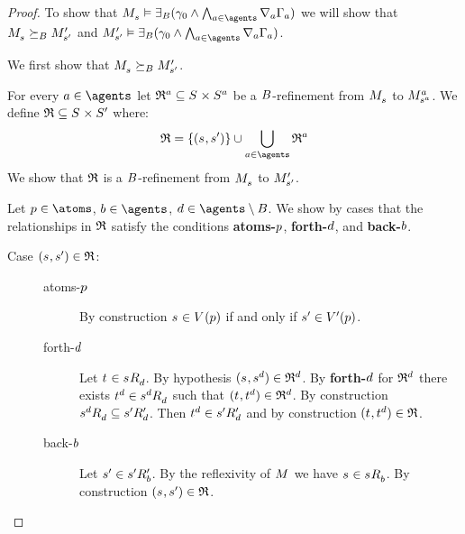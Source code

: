 \begin{proof}
To show that $\kPModel{\kStateS} \entails \somerefsBs (\gamma_0 \land \bigwedge_{\agentA \in \agents} \coversA \Gamma_\agentA)$ we will show that $\kPModel{\kStateS} \simulatesBs \kPModelP{\kStateSP}$ and $\kPModelP{\kStateSP} \entails \somerefsBs (\gamma_0 \land \bigwedge_{\agentA \in \agents} \coversA \Gamma_\agentA)$.

We first show that $\kPModel{\kStateS} \simulatesBs \kPModelP{\kStateSP}$.

For every $\agentA \in \agents$ let $\refinement^\agentA \subseteq \kStates \times \kStates[\agentA]$ be a $\agentsB$-refinement from $\kPModel{\kStateS}$ to $\kPModel[\agentA]{\kStateS[\agentA]}$.
We define $\refinement \subseteq \kStates \times \kStatesP$ where:
$$
\refinement = \{(\kStateS, \kStateSP)\} \cup \bigcup_{\agentA \in \agents} \refinement^\agentA
$$
We show that $\refinement$ is a $\agentsB$-refinement from $\kPModel{\kStateS}$ to $\kPModelP{\kStateSP}$.

Let $\atomP \in \atoms$, $\agentB \in \agents$, $\agentD \in \agents \setminus \agentsB$.
We show by cases that the relationships in $\refinement$ satisfy the conditions {\bf atoms-$\atomP$}, {\bf forth-$\agentD$}, and {\bf back-$\agentB$}.

\begin{description}
    \item[Case $(\kStateS, \kStateSP) \in \refinement$:]
        \hfill
        \begin{description}
            \item[atoms-$\atomP$]
                By construction $\kStateS \in \kValuation(\atomP)$ if and only if $\kStateSP \in \kValuationP(\atomP)$.
            \item[forth-$\agentD$]
                Let $\kStateT \in \kSuccessorsD{\kStateS}$.
                By hypothesis $(\kStateS, \kStateS[\agentD]) \in \refinement^\agentD$.
                By {\bf forth-$\agentD$} for $\refinement^\agentD$ there exists $\kStateT[\agentD] \in \kSuccessorsD{\kStateS[\agentD]}$ such that $(\kStateT, \kStateT[\agentD]) \in \refinement^\agentD$.
                By construction $\kSuccessorsD{\kStateS[\agentD]} \subseteq \kSuccessorsPD{\kStateSP}$.
                Then $\kStateT[\agentD] \in \kSuccessorsPD{\kStateSP}$ and by construction $(\kStateT, \kStateT[\agentD]) \in \refinement$.
            \item[back-$\agentB$]
                Let $\kStateSP \in \kSuccessorsPB{\kStateSP}$.
                By the reflexivity of $\kModel$ we have $\kStateS \in \kSuccessorsB{\kStateS}$.
                By construction $(\kStateS, \kStateSP) \in \refinement$.


\end{description}
\end{description}
\end{proof}
